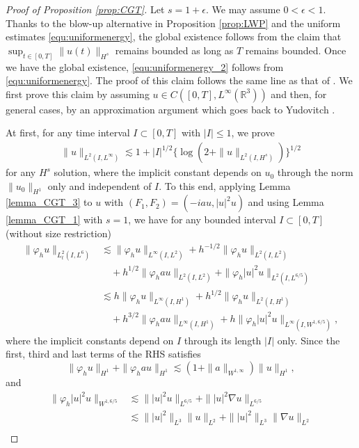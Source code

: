\documentclass[10pt%
]{amsart}
\numberwithin{equation}{section}
\newcommand{\R}{\mathbb{R}}
\theoremstyle{definition}
\begin{document}
\begin{proof}[Proof of Proposition \ref{prop:CGT}]
	Let $s=1+\epsilon$. We may assume $0<\epsilon<1$. Thanks to the blow-up alternative in Proposition \ref{prop:LWP} and the uniform estimates \eqref{equ:uniformenergy}, the global existence follows from the claim that
	$
	\sup_{t\in [0,T]}\|u(t)\|_{H^s}
	$ remains bounded as long as $T$ remains bounded. Once we have the global existence, \eqref{equ:uniformenergy_2} follows from \eqref{equ:uniformenergy}. The proof of this claim follows the same line as that of \cite[Theorem 3]{BGT}. We first prove this claim by assuming $u\in C([0,T],L^\infty(\R^3))$ and then, for general cases, by an approximation argument which goes back to Yudovitch \cite{Yudovich}. 
	
	At first, for any time interval $I\subset [0,T]$ with $|I|\le1$, we prove
	\begin{align}
		\label{prop:CGT_proof_1}
		\|u\|_{L^2(I,L^\infty)}\lesssim 1+|I|^{1/2}\{\log(2+\|u\|_{L^2(I, H^s)})\}^{1/2}
	\end{align}
	for any $H^{s}$ solution, where the implicit constant depends on $u_0$ through the norm $\|u_0\|_{H^1}$ only and independent of $I$.
	To this end, applying Lemma \ref{lemma_CGT_3} to $u$ with $(F_1,F_2)=(-iau,|u|^2u)$ and using Lemma \ref{lemma_CGT_1} with $s=1$, we have for any bounded interval $I\subset [0,T]$ (without size restriction)
	\begin{align*}%
		\|\varphi_hu\|_{L_t^2(I,L^6)}
		&\lesssim \|\varphi_hu\|_{L^\infty(I,L^2)}+h^{-1/2}\|\varphi_hu\|_{L^2(I,L^2)}\\
		&\quad+ h^{1/2}\|\varphi_h au\|_{L^2(I,L^2)}+\|\varphi_h|u|^2u\|_{L^2(I,L^{6/5})}\\
		&\lesssim h\|\varphi_hu\|_{L^\infty(I,H^1)}+h^{1/2}\|\varphi_hu\|_{L^2(I,H^1)}\\
		&\quad+ h^{3/2}\|\varphi_h au\|_{L^\infty(I,H^1)}+h\|\varphi_h|u|^2u\|_{L^\infty(I,W^{1,6/5})}, 
	\end{align*}
	where the implicit constants depend on $I$ through its length $|I|$ only. Since the first, third and last terms of the RHS satisfies
	$$
	\|\varphi_hu\|_{H^1}+\|\varphi_h au\|_{H^1}\lesssim (1+\|a\|_{W^{1,\infty}})\|u\|_{H^1},
	$$
	and
	\begin{align*}
		\|\varphi_h|u|^2u\|_{W^{1,6/5}}
		&\lesssim \||u|^2u\|_{L^{6/5}}+\||u|^2\nabla u\|_{L^{6/5}}\\
		&\lesssim \||u|^2\|_{L^3}\|u\|_{L^2}+\||u|^2\|_{L^3}\|\nabla u\|_{L^2}\\

\end{align*}
\end{proof}
\end{document}
